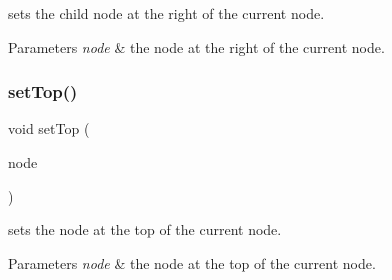 sets the child node at the right of the current node. 


\begin{DoxyParams}{Parameters}
{\em node} & the node at the right of the current node. \\
\hline
\end{DoxyParams}
\mbox{\label{class_open_chams_1_1_node_a32e2fbbb73c6b7ee4a30189cc30106bf}} 
\subsubsection{\texorpdfstring{set\+Top()}{setTop()}}
{\footnotesize\ttfamily void set\+Top (\begin{DoxyParamCaption}\item[{\hyperlink{class_open_chams_1_1_node}{Node} $\ast$}]{node }\end{DoxyParamCaption})\hspace{0.3cm}{\ttfamily [inline]}}



sets the node at the top of the current node. 


\begin{DoxyParams}{Parameters}
{\em node} & the node at the top of the current node. \\
\hline
\end{DoxyParams}
